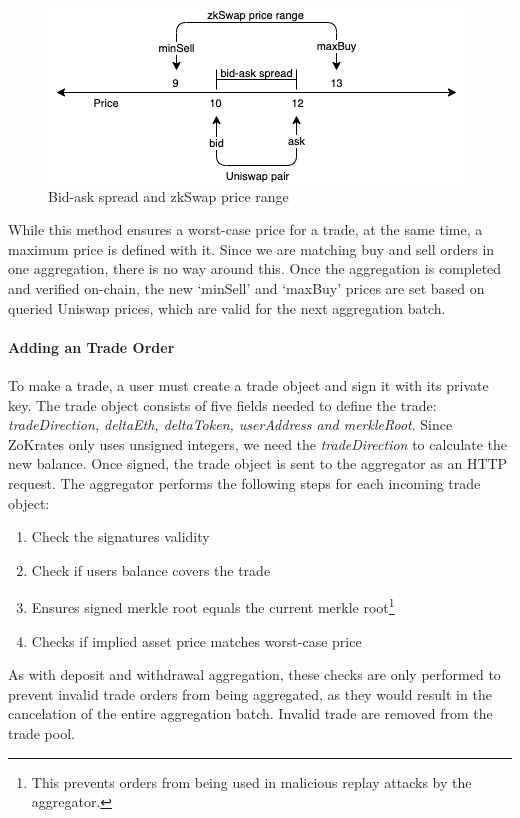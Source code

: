 \documentclass[../../thesis.tex]{subfiles}
\begin{document}
\begin{figure}[h]
    \centerline{\includegraphics[totalheight=3cm]{diagrams/priceing.png}}
    \caption{Bid-ask spread and zkSwap price range}
    \label{fig:price}
\end{figure}

While this method ensures a worst-case price for a trade, at the same time, a maximum price is defined with it. Since we are matching buy and sell orders in one aggregation, there is no way around this. Once the aggregation is completed and verified on-chain, the new `minSell' and `maxBuy' prices are set based on queried Uniswap prices, which are valid for the next aggregation batch.

\paragraph{Adding an Trade Order}
To make a trade, a user must create a trade object and sign it with its private key. The trade object consists of five fields needed to define the trade: \textit{tradeDirection, deltaEth, deltaToken, userAddress and merkleRoot}. Since ZoKrates only uses unsigned integers, we need the \textit{tradeDirection} to calculate the new balance. Once signed, the trade object is sent to the aggregator as an HTTP request. The aggregator performs the following steps for each incoming trade object:
\begin{enumerate}
    \item Check the signatures validity
    \item Check if users balance covers the trade
    \item Ensures signed merkle root equals the current merkle root\footnote{This prevents orders from being used in malicious replay attacks by the aggregator.}
    \item Checks if implied asset price matches worst-case price
\end{enumerate}

As with deposit and withdrawal aggregation, these checks are only performed to prevent invalid trade orders from being aggregated, as they would result in the cancelation of the entire aggregation batch. Invalid trade are removed from the trade pool. 
\end{document}
